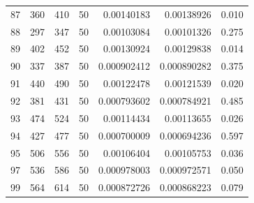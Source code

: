 \begin{tabular}{r r r r r r r}
87 & 360 & 410 & 50 & 0.00140183 & 0.00138926 & 0.010 \\
88 & 297 & 347 & 50 & 0.00103084 & 0.00101326 & 0.275 \\
89 & 402 & 452 & 50 & 0.00130924 & 0.00129838 & 0.014 \\
90 & 337 & 387 & 50 & 0.000902412 & 0.000890282 & 0.375 \\
91 & 440 & 490 & 50 & 0.00122478 & 0.00121539 & 0.020 \\
92 & 381 & 431 & 50 & 0.000793602 & 0.000784921 & 0.485 \\
93 & 474 & 524 & 50 & 0.00114434 & 0.00113655 & 0.026 \\
94 & 427 & 477 & 50 & 0.000700009 & 0.000694236 & 0.597 \\
95 & 506 & 556 & 50 & 0.00106404 & 0.00105753 & 0.036 \\
97 & 536 & 586 & 50 & 0.000978003 & 0.000972571 & 0.050 \\
99 & 564 & 614 & 50 & 0.000872726 & 0.000868223 & 0.079 \\
\bottomrule
\end{tabular}

